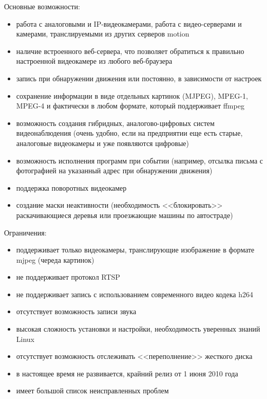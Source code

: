 Основные возможности:
\smallskip
\begin{itemize}
	\item
	работа с аналоговыми и IP-видеокамерами, работа с видео-серверами и камерами,
	транслируемыми из других серверов motion
	\item
	наличие встроенного веб-сервера, что позволяет обратиться к правильно
	настроенной видеокамере из любого веб-браузера
	\item
	запись при обнаружении движения или постоянно, в зависимости от настроек
	\item
	сохранение информации в виде отдельных картинок (MJPEG), MPEG-1, MPEG-4 и
	фактически в любом формате, который поддерживает ffmpeg
	\item
	возможность создания гибридных, аналогово-цифровых систем видеонаблюдения
	(очень удобно, если на предприятии еще есть старые, аналоговые видеокамеры
	и уже появляются цифровые)
	\item
	возможность исполнения программ при событии
	(например, отсылка письма с фотографией на указанный адрес при обнаружении движения)
	\item
	поддержка поворотных видеокамер
	\item
	создание маски неактивности (необходимость <<блокировать>> раскачивающиеся
	деревья или проезжающие машины по автостраде)
\end{itemize}

\medskip

Ограничения:
\smallskip
\begin{itemize}
	\item
	поддерживает только видеокамеры, транслирующие изображение в формате mjpeg (череда картинок)
	\item не поддерживает протокол RTSP
	\item не поддерживает запись с использованием современного видео кодека h264
	\item отсутствует возможность записи звука
	\item высокая сложность установки и настройки, необходимость уверенных знаний Linux
	\item отсутствует возможность отслеживать <<переполнение>> жесткого диска
	\item в настоящее время не развивается, крайний релиз от 1 июня 2010 года
	\item имеет большой список неисправленных проблем
\end{itemize}

\medskip

